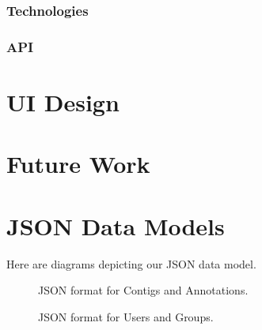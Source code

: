 \documentclass[10pt, conference, compsocconf]{IEEEtran}
\begin{document}
\subsubsection{Technologies}

\subsubsection{API}

\section{UI Design}\label{sec:ui}

\section{Future Work}\label{sec:future}






\onecolumn
\appendices

\section{JSON Data Models}\label{sec:data_models}
\centering
Here are diagrams depicting our JSON data model.

\begin{figure*}[h]
   \centering
   \caption{JSON format for Contigs and Annotations.}
\end{figure*}

\begin{figure*}[h]
   \centering
   \caption{JSON format for Users and Groups.}
\end{figure*}
\end{document}
